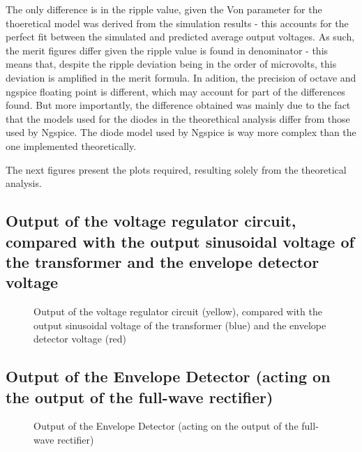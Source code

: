     The only difference is in the ripple value, given the Von parameter for the thoeretical model was derived from the simulation results - this accounts for the perfect fit between the simulated and predicted average output voltages. As such, the merit figures differ given the ripple value is found in denominator - this means that, despite the ripple deviation being in the order of microvolts, this deviation is amplified in the merit formula. In adition, the precision of octave and ngspice floating point is different, which may account for part of the differences found. But more importantly, the difference obtained was mainly due to the fact that the models
used for the diodes in the theorethical analysis differ from those used by Ngspice. The diode
model used by Ngspice is way more complex than the one implemented theoretically.
  
  The next figures present the plots required, resulting solely from the theoretical analysis.




\subsection{Output of the voltage regulator circuit, compared with the output sinusoidal voltage of the transformer and the envelope detector voltage}

\par
\begin{figure}[H] \centering
\caption{Output of the voltage regulator circuit (yellow), compared with the output sinusoidal voltage of the transformer (blue) and the envelope detector voltage (red)}
\label{fig:all_vout}
\end{figure}


\subsection{Output of the Envelope Detector (acting on the output of the full-wave rectifier)}

\par
\begin{figure}[H] \centering
\caption{Output of the Envelope Detector (acting on the output of the full-wave rectifier)}
\label{fig:envelope}
\end{figure}



